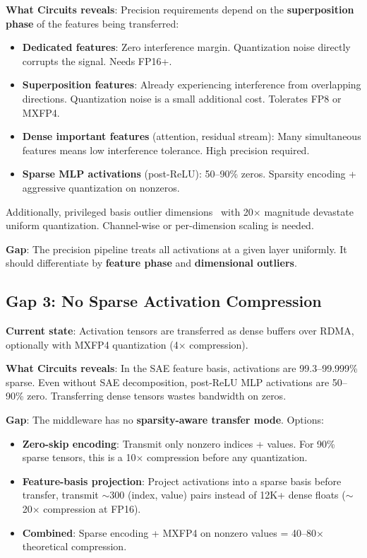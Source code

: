 \documentclass[11pt,letterpaper]{article}
\begin{document}
\textbf{What Circuits reveals}: Precision requirements depend on the \textbf{superposition phase} of the features being transferred:
\begin{itemize}
    \item \textbf{Dedicated features}: Zero interference margin. Quantization noise directly corrupts the signal. Needs FP16+.
    \item \textbf{Superposition features}: Already experiencing interference from overlapping directions. Quantization noise is a small additional cost. Tolerates FP8 or MXFP4.
    \item \textbf{Dense important features} (attention, residual stream): Many simultaneous features means low interference tolerance. High precision required.
    \item \textbf{Sparse MLP activations} (post-ReLU): 50--90\% zeros. Sparsity encoding + aggressive quantization on nonzeros.
\end{itemize}

Additionally, privileged basis outlier dimensions~\cite{anthropic2023privileged} with 20$\times$ magnitude devastate uniform quantization. Channel-wise or per-dimension scaling is needed.

\textbf{Gap}: The precision pipeline treats all activations at a given layer uniformly. It should differentiate by \textbf{feature phase} and \textbf{dimensional outliers}.

\subsection{Gap 3: No Sparse Activation Compression}

\textbf{Current state}: Activation tensors are transferred as dense buffers over RDMA, optionally with MXFP4 quantization (4$\times$ compression).

\textbf{What Circuits reveals}: In the SAE feature basis, activations are 99.3--99.999\% sparse. Even without SAE decomposition, post-ReLU MLP activations are 50--90\% zero. Transferring dense tensors wastes bandwidth on zeros.

\textbf{Gap}: The middleware has no \textbf{sparsity-aware transfer mode}. Options:
\begin{itemize}
    \item \textbf{Zero-skip encoding}: Transmit only nonzero indices + values. For 90\% sparse tensors, this is a 10$\times$ compression before any quantization.
    \item \textbf{Feature-basis projection}: Project activations into a sparse basis before transfer, transmit $\sim$300 (index, value) pairs instead of 12K+ dense floats ($\sim$20$\times$ compression at FP16).
    \item \textbf{Combined}: Sparse encoding + MXFP4 on nonzero values = 40--80$\times$ theoretical compression.
\end{itemize}
\end{document}
